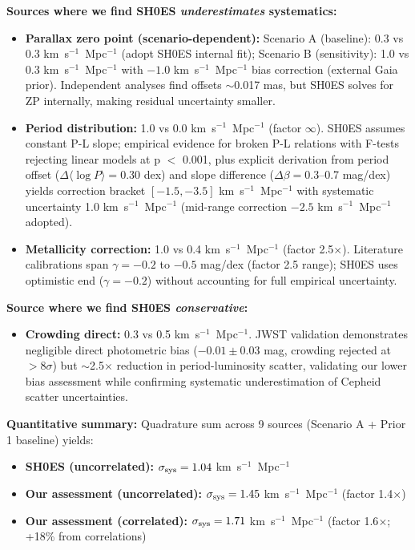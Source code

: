 \documentclass[preprint, linenumbers]{aastex701}
\begin{document}
\textbf{Sources where we find SH0ES \textit{underestimates} systematics:}
\begin{itemize}
\item \textbf{Parallax zero point (scenario-dependent):} Scenario A (baseline): 0.3 vs 0.3 km~s$^{-1}$~Mpc$^{-1}$ (adopt SH0ES internal fit); Scenario B (sensitivity): 1.0 vs 0.3 km~s$^{-1}$~Mpc$^{-1}$ with $-1.0$ km~s$^{-1}$~Mpc$^{-1}$ bias correction (external Gaia prior). Independent analyses find offsets $\sim$0.017 mas, but SH0ES solves for ZP internally, making residual uncertainty smaller.
\item \textbf{Period distribution:} 1.0 vs 0.0 km~s$^{-1}$~Mpc$^{-1}$ (factor $\infty$). SH0ES assumes constant P-L slope; empirical evidence for broken P-L relations \citep{Ngeow2006,Kodric2015} with F-tests rejecting linear models at p $<$ 0.001, plus explicit derivation from period offset ($\Delta\langle \log P \rangle = 0.30$ dex) and slope difference ($\Delta\beta = 0.3$--0.7 mag/dex) yields correction bracket $[-1.5, -3.5]$ km~s$^{-1}$~Mpc$^{-1}$ with systematic uncertainty 1.0 km~s$^{-1}$~Mpc$^{-1}$ (mid-range correction $-2.5$ km~s$^{-1}$~Mpc$^{-1}$ adopted).
\item \textbf{Metallicity correction:} 1.0 vs 0.4 km~s$^{-1}$~Mpc$^{-1}$ (factor 2.5$\times$). Literature calibrations span $\gamma = -0.2$ to $-0.5$ mag/dex (factor 2.5 range); SH0ES uses optimistic end ($\gamma = -0.2$) without accounting for full empirical uncertainty.
\end{itemize}

\textbf{Source where we find SH0ES \textit{conservative}:}
\begin{itemize}
\item \textbf{Crowding direct:} 0.3 vs 0.5 km~s$^{-1}$~Mpc$^{-1}$. JWST validation \citep{Riess2024JWST} demonstrates negligible direct photometric bias ($-0.01 \pm 0.03$ mag, crowding rejected at $>8\sigma$) but $\sim$2.5$\times$ reduction in period-luminosity scatter, validating our lower bias assessment while confirming systematic underestimation of Cepheid scatter uncertainties.
\end{itemize}

\textbf{Quantitative summary:} Quadrature sum across 9 sources (Scenario A + Prior 1 baseline) yields:
\begin{itemize}
\item \textbf{SH0ES (uncorrelated):} $\sigma_{\rm sys} = 1.04$ km~s$^{-1}$~Mpc$^{-1}$
\item \textbf{Our assessment (uncorrelated):} $\sigma_{\rm sys} = 1.45$ km~s$^{-1}$~Mpc$^{-1}$ (factor 1.4$\times$)
\item \textbf{Our assessment (correlated):} $\sigma_{\rm sys} = 1.71$ km~s$^{-1}$~Mpc$^{-1}$ (factor 1.6$\times$; +18\% from correlations)
\end{itemize}
\end{document}
